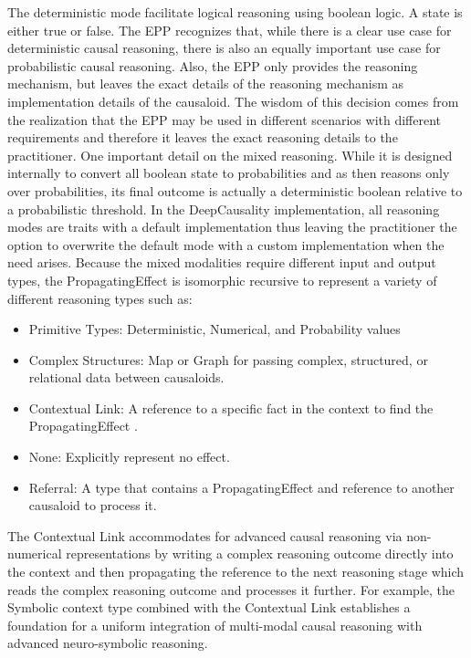The deterministic mode facilitate logical reasoning using boolean logic. A state is either true or false. The EPP recognizes that, while there is a clear use case for deterministic causal reasoning, there is also an equally important use case for probabilistic causal reasoning. Also, the EPP only provides the reasoning mechanism, but leaves the exact details of the reasoning mechanism as implementation details of the causaloid. The wisdom of this decision comes from the realization that the EPP may be used in different scenarios with different requirements and therefore it leaves the exact reasoning details to the practitioner. One important detail on the mixed reasoning. While it is designed internally to convert all boolean state to probabilities and as then reasons only over  probabilities, its final outcome is actually a deterministic boolean relative to a probabilistic threshold. In the DeepCausality implementation, all reasoning modes are traits with a default implementation thus leaving the practitioner the option to overwrite the default mode with a custom implementation when the need arises. Because the mixed modalities require different input and output types, the PropagatingEffect is isomorphic recursive to represent a variety of different reasoning types such as:

\begin{itemize}	
	\item Primitive Types: Deterministic, Numerical, and Probability values
	\item Complex Structures: Map or Graph for passing complex, structured, or relational data between causaloids.
	\item Contextual Link: A reference to a specific fact in the context to find the PropagatingEffect . 
	\item None: Explicitly represent no effect.
	\item Referral: A type that contains a PropagatingEffect and reference to another causaloid to process it.
\end{itemize}

The Contextual Link accommodates for advanced causal reasoning via non-numerical representations by writing a complex reasoning outcome directly into the context and then propagating the reference to the next reasoning stage which reads the complex reasoning outcome and processes it further. For example, the Symbolic context type combined with the Contextual Link establishes a foundation for a uniform integration of multi-modal causal reasoning with advanced neuro-symbolic reasoning.


